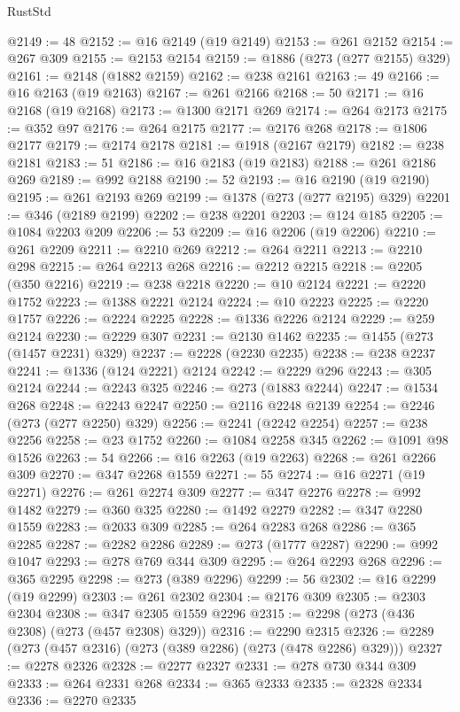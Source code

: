 \begin{lexlean}{RustStd}
\begin{coremodule}
{\begin{coremodule}
{{{{{{{{{{{{{{{{{{{{{{{{{{{{{{{{{{{{{{{{{{{{{{{{{{{{{{{{{{{{{{{{{{{{{{{{{{{{{{{{{{{{{@2149 := 48
@2152 := @16 @2149 (@19 @2149)
@2153 := @261 @2152
@2154 := @267 @309
@2155 := @2153 @2154
@2159 := @1886 (@273 (@277 @2155) @329)
@2161 := @2148 (@1882 @2159)
@2162 := @238 @2161
@2163 := 49
@2166 := @16 @2163 (@19 @2163)
@2167 := @261 @2166
@2168 := 50
@2171 := @16 @2168 (@19 @2168)
@2173 := @1300 @2171 @269
@2174 := @264 @2173
@2175 := @352 @97
@2176 := @264 @2175
@2177 := @2176 @268
@2178 := @1806 @2177
@2179 := @2174 @2178
@2181 := @1918 (@2167 @2179)
@2182 := @238 @2181
@2183 := 51
@2186 := @16 @2183 (@19 @2183)
@2188 := @261 @2186 @269
@2189 := @992 @2188
@2190 := 52
@2193 := @16 @2190 (@19 @2190)
@2195 := @261 @2193 @269
@2199 := @1378 (@273 (@277 @2195) @329)
@2201 := @346 (@2189 @2199)
@2202 := @238 @2201
@2203 := @124 @185
@2205 := @1084 @2203 @209
@2206 := 53
@2209 := @16 @2206 (@19 @2206)
@2210 := @261 @2209
@2211 := @2210 @269
@2212 := @264 @2211
@2213 := @2210 @298
@2215 := @264 @2213 @268
@2216 := @2212 @2215
@2218 := @2205 (@350 @2216)
@2219 := @238 @2218
@2220 := @10 @2124
@2221 := @2220 @1752
@2223 := @1388 @2221 @2124
@2224 := @10 @2223
@2225 := @2220 @1757
@2226 := @2224 @2225
@2228 := @1336 @2226 @2124
@2229 := @259 @2124
@2230 := @2229 @307
@2231 := @2130 @1462
@2235 := @1455 (@273 (@1457 @2231) @329)
@2237 := @2228 (@2230 @2235)
@2238 := @238 @2237
@2241 := @1336 (@124 @2221) @2124
@2242 := @2229 @296
@2243 := @305 @2124
@2244 := @2243 @325
@2246 := @273 (@1883 @2244)
@2247 := @1534 @268
@2248 := @2243 @2247
@2250 := @2116 @2248 @2139
@2254 := @2246 (@273 (@277 @2250) @329)
@2256 := @2241 (@2242 @2254)
@2257 := @238 @2256
@2258 := @23 @1752
@2260 := @1084 @2258 @345
@2262 := @1091 @98 @1526
@2263 := 54
@2266 := @16 @2263 (@19 @2263)
@2268 := @261 @2266 @309
@2270 := @347 @2268 @1559
@2271 := 55
@2274 := @16 @2271 (@19 @2271)
@2276 := @261 @2274 @309
@2277 := @347 @2276
@2278 := @992 @1482
@2279 := @360 @325
@2280 := @1492 @2279
@2282 := @347 @2280 @1559
@2283 := @2033 @309
@2285 := @264 @2283 @268
@2286 := @365 @2285
@2287 := @2282 @2286
@2289 := @273 (@1777 @2287)
@2290 := @992 @1047
@2293 := @278 @769 @344 @309
@2295 := @264 @2293 @268
@2296 := @365 @2295
@2298 := @273 (@389 @2296)
@2299 := 56
@2302 := @16 @2299 (@19 @2299)
@2303 := @261 @2302
@2304 := @2176 @309
@2305 := @2303 @2304
@2308 := @347 @2305 @1559 @2296
@2315 := @2298 (@273 (@436 @2308) (@273 (@457 @2308) @329))
@2316 := @2290 @2315
@2326 := @2289 (@273 (@457 @2316) (@273 (@389 @2286) (@273 (@478 @2286) @329)))
@2327 := @2278 @2326
@2328 := @2277 @2327
@2331 := @278 @730 @344 @309
@2333 := @264 @2331 @268
@2334 := @365 @2333
@2335 := @2328 @2334
@2336 := @2270 @2335
}}}}}}}}}}}}}}}}}}}}}}}}}}}}}}}}}}}}}}}}}}}}}}}}}}}}}}}}}}}}}}}}}}}}}}}}}}}}}}}}}}}}}
\end{coremodule}}
\end{coremodule}
\end{lexlean}
